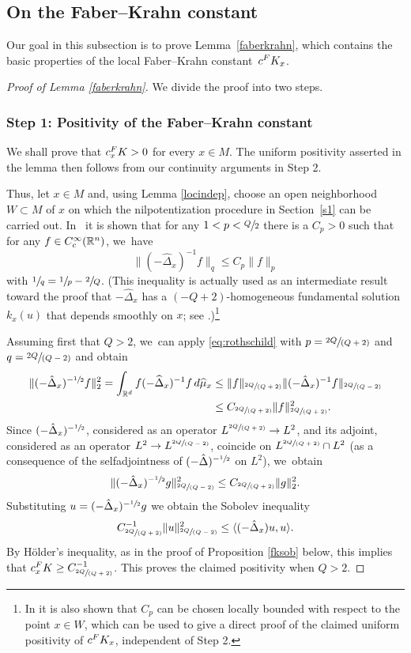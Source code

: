 \documentclass[11pt]{article}
\let\oldsfrac\sfrac
\renewcommand{\sfrac}[2]{{\oldsfrac{#1}{#2}}}
\newcommand{\spfrac}[2]{{\sfrac{#1}{(#2)}}}
\newcommand{\rc}{\textup{c}}
\newcommand{\FK}{\textup{FK}}
\theoremstyle{definition}
\newcommand{\1}{\mathbbm{1}}
\newcommand{\R}{\mathbb{R}}
\numberwithin{equation}{section}
\begin{document}
\subsection{On the Faber--Krahn constant}\label{sec:fk}
Our goal in this subsection is to prove Lem\-ma~\ref{faberkrahn}, which contains the basic properties of the local Faber--Krahn constant~$c^\FK_x$.

\begin{proof}[Proof of Lemma \ref{faberkrahn}]
We divide the proof into two steps.

\subsubsection*{Step 1: Positivity of the Faber--Krahn constant}
We shall prove that $c_x^\FK>0$ for every $x\in M$. The uniform positivity asserted in the lemma then follows from our continuity arguments in Step 2.

Thus, let $x\in M$ and, using Lemma \ref{locindep}, choose an open neighborhood $W\subset M$ of $x$ on which the nilpotentization procedure in Section~\ref{s1} can be carried out. In~\cite[Th.\,4.24]{Rot} it is shown that for any $1<p<\sfrac Q2$ there is a $C_{p} >0$ such that for any $f \in C_\rc^\infty (\mathbb R^n)$, we~have
\begin{equation}
\label{eq:rothschild}
\| (-\widehat \Delta_x)^{-1} f \|_q \leq C_{p} \| f \|_p
\end{equation}
with $\sfrac 1q=\sfrac 1p -\sfrac 2 Q$.
(This inequality is actually used as an intermediate result toward the proof that $-\widehat \Delta_x$ has a $(-Q+2)$-homogeneous fundamental solution $k_x(u)$ that depends smoothly on $x$; see \cite[Th.\,3.6]{Rot}.)\footnote{In \cite{Rot} it is also shown that $C_p$ can be chosen locally bounded with respect to the point $x\in W$, which can be used to give a direct proof of the claimed uniform positivity of $c^\FK_x$, independent of Step 2.}

Assuming first that $Q>2$, we~can apply \eqref{eq:rothschild} with $p=\spfrac{2Q}{Q+2}$ and $q=\spfrac{2Q}{Q-2}$ and obtain
\begin{align*}
\| (-\hat\Delta_x)^{-\sfrac12} f\|_2^2 =
\int_{\R^d} f (-\widehat \Delta_x)^{-1} f \,d\widehat\mu_x &\leq \| f\|_{\spfrac{2Q}{Q+2}} \|(-\hat\Delta_x)^{-1} f\|_{\spfrac{2Q}{Q-2}}\\
&\leq C_{\spfrac{2Q}{Q+2}} \| f \|_{\spfrac{2Q}{Q+2}}^2.
\end{align*}
Since $(-\hat\Delta_x)^{-\sfrac12}$, considered as an operator $L^{\spfrac{2Q}{Q+2}}\to L^2$, and its adjoint, considered as an operator $L^2\to L^{\spfrac{2Q}{Q-2}}$, coincide on $L^{\spfrac{2Q}{Q+2}}\cap L^2$ (as a consequence of the selfadjointness of $(-\hat\Delta)^{-\sfrac12}$ on $L^2$), we~obtain
\[
\| (-\hat\Delta_x)^{-\sfrac12} g\|_{\spfrac{2Q}{Q-2}}^2 \leq C_{\spfrac{2Q}{Q+2}} \| g \|_{2}^2.
\]
Substituting $u=(-\hat\Delta_x)^{-\sfrac12} g$ we obtain the Sobolev inequality
\[
C_{\spfrac{2Q}{Q+2}}^{-1} \| u \|_{\spfrac{2Q}{Q-2}}^2 \leq \langle (-\hat\Delta_x) u,u \rangle.
\]
By Hölder's inequality, as in the proof of Proposition \ref{fksob} below, this implies that $c_x^\FK\geq C_{\spfrac{2Q}{Q+2}}^{-1}$. This proves the claimed positivity when $Q>2$.


\end{proof}
\end{document}
